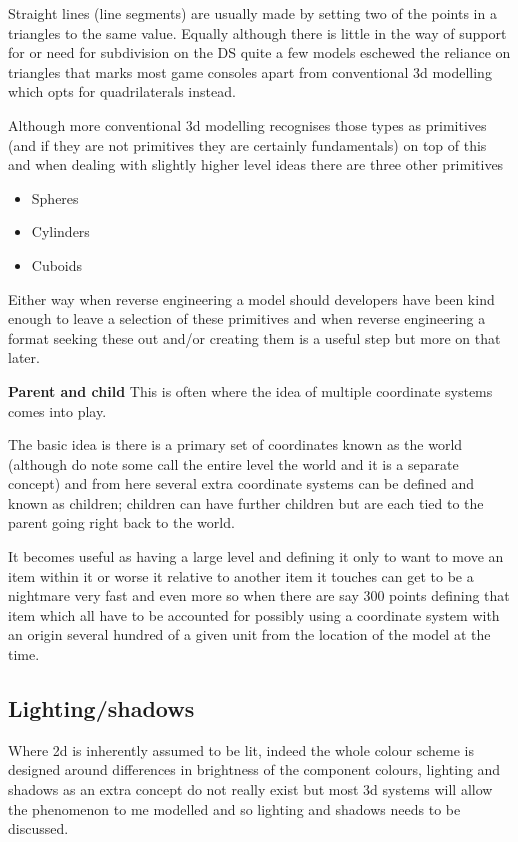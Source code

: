 \documentclass[
]{book}
\providecommand{\tightlist}{%
  \setlength{\itemsep}{0pt}\setlength{\parskip}{0pt}}
\begin{document}
Straight lines (line segments) are usually made by setting two of the points in a triangles to the same value. Equally although there is little in the way of support for or need for subdivision on the DS quite a few models eschewed the reliance on triangles that marks most game consoles apart from conventional 3d modelling which opts for quadrilaterals instead.

Although more conventional 3d modelling recognises those types as primitives (and if they are not primitives they are certainly fundamentals) on top of this and when dealing with slightly higher level ideas there are three other primitives

\begin{itemize}
\tightlist
\item
  Spheres
\item
  Cylinders
\item
  Cuboids
\end{itemize}

Either way when reverse engineering a model should developers have been kind enough to leave a selection of these primitives and when reverse engineering a format seeking these out and/or creating them is a useful step but more on that later.

\textbf{Parent and child} This is often where the idea of multiple coordinate systems comes into play.

The basic idea is there is a primary set of coordinates known as the world (although do note some call the entire level the world and it is a separate concept) and from here several extra coordinate systems can be defined and known as children; children can have further children but are each tied to the parent going right back to the world.

It becomes useful as having a large level and defining it only to want to move an item within it or worse it relative to another item it touches can get to be a nightmare very fast and even more so when there are say 300 points defining that item which all have to be accounted for possibly using a coordinate system with an origin several hundred of a given unit from the location of the model at the time.

\hypertarget{lightingshadows}{%
\subsection{Lighting/shadows}\label{lightingshadows}}

Where 2d is inherently assumed to be lit, indeed the whole colour scheme is designed around differences in brightness of the component colours, lighting and shadows as an extra concept do not really exist but most 3d systems will allow the phenomenon to me modelled and so lighting and shadows needs to be discussed.
\end{document}
